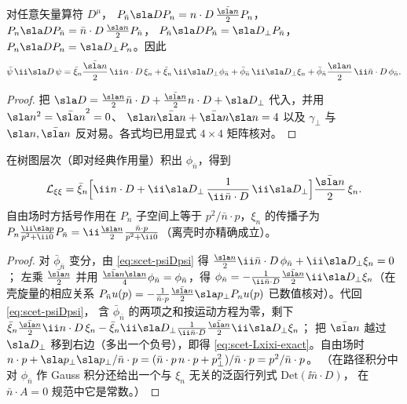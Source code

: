 \begin{lemma}\tagR\label{lem:scet-blocks}
对任意矢量算符 $D^\mu$，
$P_{\bar n}\sla DP_n=n\cdot D\,\frac{\nbslash}{2}P_n$，$P_n\sla DP_{\bar n}=\bar n\cdot D\,\frac{\nslash}{2}P_{\bar n}$，
$P_{\bar n}\sla DP_{\bar n}=\sla D_\perp P_{\bar n}$，$P_n\sla DP_n=\sla D_\perp P_n$。因此
\begin{equation}\label{eq:scet-psiDpsi}
\bar\psi\,\ii\sla D\,\psi=\bar\xi_n\frac{\nbslash}{2}\,\ii n\cdot D\,\xi_n+\bar\xi_n\,\ii\sla D_\perp\phi_{\bar n}
+\bar\phi_{\bar n}\,\ii\sla D_\perp\xi_n+\bar\phi_{\bar n}\frac{\nslash}{2}\,\ii\bar n\cdot D\,\phi_{\bar n}.
\end{equation}
\end{lemma}

\begin{proof}
把 $\sla D=\frac{\nslash}{2}\bar n\cdot D+\frac{\nbslash}{2}n\cdot D+\sla D_\perp$ 代入，并用 $\nslash^2=\nbslash^2=0$、
$\nslash\nbslash+\nbslash\nslash=4$ 以及 $\gamma_\perp$ 与 $\nslash,\nbslash$ 反对易。各式均已用显式 $4\times4$ 矩阵核对。
\end{proof}

\begin{proposition}[树图层次的共线夸克拉氏量]\tagR\label{prop:scet-Lxixi}
在树图层次（即对经典作用量）积出 $\phi_{\bar n}$，得到
\begin{equation}\label{eq:scet-Lxixi-exact}
\mathcal L_{\xi\xi}=\bar\xi_n\Big[\ii n\cdot D+\ii\sla D_\perp\,\frac{1}{\ii\bar n\cdot D}\,\ii\sla D_\perp\Big]\frac{\nbslash}{2}\,\xi_n .
\end{equation}
自由场时方括号作用在 $P_n$ 子空间上等于 $p^2/\bar n\cdot p$，$\xi_n$ 的传播子为
$P_n\frac{\ii\sla p}{p^2+\ii0}P_{\bar n}=\ii\frac{\nslash}{2}\frac{\bar n\cdot p}{p^2+\ii0}$（离壳时亦精确成立）。
\end{proposition}

\begin{proof}
对 $\bar\phi_{\bar n}$ 变分，由 \cref{eq:scet-psiDpsi} 得 $\frac{\nslash}{2}\ii\bar n\cdot D\,\phi_{\bar n}+\ii\sla D_\perp\xi_n=0$；
左乘 $\frac{\nbslash}{2}$ 并用 $\frac{\nbslash\nslash}{4}\phi_{\bar n}=\phi_{\bar n}$，得
$\phi_{\bar n}=-\frac{1}{\ii\bar n\cdot D}\frac{\nbslash}{2}\ii\sla D_\perp\xi_n$（在壳旋量的相应关系
$P_{\bar n}u(p)=-\frac{1}{\bar n\cdot p}\frac{\nbslash}{2}\sla p_\perp P_nu(p)$ 已数值核对）。代回 \cref{eq:scet-psiDpsi}，
含 $\bar\phi_{\bar n}$ 的两项之和按运动方程为零，剩下
$\bar\xi_n\frac{\nbslash}{2}\ii n\cdot D\,\xi_n-\bar\xi_n\ii\sla D_\perp\frac{1}{\ii\bar n\cdot D}\frac{\nbslash}{2}\ii\sla D_\perp\xi_n$；
把 $\nbslash$ 越过 $\sla D_\perp$ 移到右边（多出一个负号），即得 \cref{eq:scet-Lxixi-exact}。自由场时
$n\cdot p+\sla p_\perp\sla p_\perp/\bar n\cdot p=(\bar n\cdot p\,n\cdot p+p_\perp^2)/\bar n\cdot p=p^2/\bar n\cdot p$。
（在路径积分中对 $\phi_{\bar n}$ 作 Gauss 积分还给出一个与 $\xi_n$ 无关的泛函行列式 $\mathrm{Det}(\ii\bar n\cdot D)$，
在 $\bar n\cdot A=0$ 规范中它是常数。）
\end{proof}

